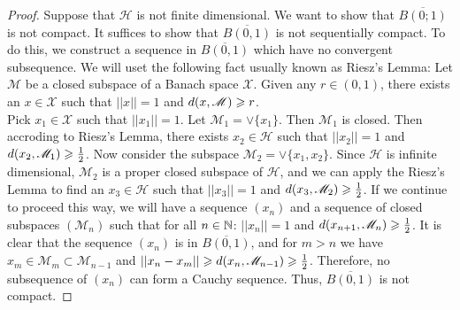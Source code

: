 \begin{proof}
    Suppose that $\mathscr{H}$ is not finite dimensional.
    We want to show that $\overline{B(0;1)}$ is not compact. 
    It suffices to show that $\overline{B(0,1)}$ is not sequentially compact.
    To do this, we construct a sequence in $\overline{B(0,1)}$ which have no convergent subsequence.
    We will uset the following fact usually known as Riesz's Lemma:
    Let $\mathscr{M}$ be a closed subspace of a Banach space $\mathscr{X}$. Given any $r\in (0,1)$, 
    there exists an $x\in\mathscr{X}$ such that $||x||=1$ and $d(x,\mathscr{M})\geqslant r$.
    \\
    Pick $x_1\in\mathscr{X}$ such that $||x_1||=1$. Let $\mathscr{M}_1=\vee \{x_1\}$. Then $\mathscr{M}_1$ is closed.
    Then accroding to Riesz's Lemma, there exists $x_2\in \mathscr{H}$ such that $||x_2||=1$ and $d(x_2,\mathscr{M}_1)\geqslant \frac{1}{2}$.
    Now consider the subspace $\mathscr{M}_2=\vee\{x_1, x_2\}$. Since $\mathscr{H}$ is infinite dimensional,
    $\mathscr{M}_2$ is a proper closed subspace of $\mathscr{H}$, and we can apply the Riesz's Lemma to find
    an $x_3 \in \mathscr{H}$ such that $||x_3||=1$ and $d(x_3,\mathscr{M}_2)\geqslant \frac{1}{2}$.
    If we continue to proceed this way, we will have a sequence $(x_n)$ and a sequence of
    closed subspaces $(\mathscr{M}_n)$ such that for all $n \in \mathbb{N}$: $||x_n||=1$ and $d(x_{n+1},\mathscr{M}_n)\geqslant \frac{1}{2}$.
    It is clear that the sequence $(x_n)$ is in $\overline{B(0,1)}$, 
    and for $m>n$ we have $x_m\in \mathscr{M}_m\subset \mathscr{M}_{n-1}$ and $||x_n-x_m||\geqslant d(x_n,\mathscr{M}_{n-1})\geqslant \frac{1}{2}$.
    Therefore, no subsequence of $(x_n)$ can form a Cauchy sequence. 
    Thus, $\overline{B(0, 1)}$ is not compact.
\end{proof}


